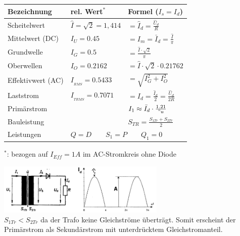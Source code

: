 	\begin{minipage}[c]{10cm}  
		\begin{tabular}{| l | l | l |}
    		\hline 
      		\textbf{Bezeichnung}
      		& \textbf{rel. Wert$^\ast$}
      		& \textbf{Formel} ($I_s = I_d$)\\
      		\hline
      		Scheitelwert
      		& $\hat{I} = \sqrt{2} = 1,414$
      		& $= \hat{I}_d = \frac{\hat{U}_d}{R} $ \\
      		Mittelwert (DC)
      		& $I_U = 0.45$
      		& $= I_m = \bar{I}_d = \frac{\hat{I}}{\pi}$ \\
      		Grundwelle
      		& $I_G = 0.5$
      		& $= \frac{\hat{I} \cdot \sqrt{2}}{\pi}$ \\
      		Oberwellen
      		& $I_O = 0.2162$
      		& $= \hat{I} \cdot \sqrt{2} \cdot 0.21762$ \\
      		Effektivwert (AC)
      		& $I_{_{RMS}} = 0.5433$
      		& $ = \sqrt{I_G^2 + I_O^2}$\\
      		Laststrom
      		& $I_{_{TRMS}} = 0.7071$
      		& $= I_{d} = \frac{\hat{I}_d}{2} =\frac{\hat{U}_d}{2 R}$ \\
      		Primärstrom
      		&
      		& $I_1 \approx \bar{I}_d \cdot \frac{1.21}{"u}$ \\
      		Bauleistung 
      		&
      		& $S_{TR} = \frac{S_{1Tr} + S_{2Tr}}{2}$ \\
      		\cline{2-3}
			Leistungen
		 	& \multicolumn{2}{l|}{ $Q = D \qquad S_1 = P \qquad Q_1 = 0$} \\
      		\hline 
    	\end{tabular} \newline
    	$^\ast$: bezogen auf $I_{Eff} = 1A$ im AC-Stromkreis ohne Diode
	\end{minipage}   
	\begin{minipage}[c]{8cm}  
			\includegraphics[width=8cm]{bilder/EinwegGR.png}  \\			
	$S_{1Tr} < S_{2Tr}$ da der Trafo keine Gleichstr\"ome übertr\"agt. Somit erscheint der Prim\"arstrom
	als Sekund\"arstrom mit unterdrücktem Gleichstromanteil.\\			
	\end{minipage}

